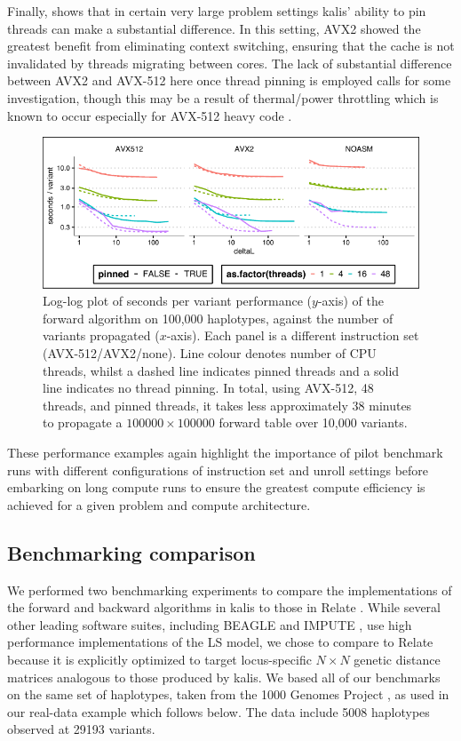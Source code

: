 \documentclass[pdflatex,referee,lineno,sn-nature]{sn-jnl}%
\newcommand{\pkg}[1]{{\fontseries{m}\fontseries{b}\selectfont #1}}
\begin{document}
Finally,  shows that in certain very large problem settings \pkg{kalis}' ability to pin threads can make a substantial difference.
In this setting, AVX2 showed the greatest benefit from eliminating context switching, ensuring that the cache is not invalidated by threads migrating between cores.
The lack of substantial difference between AVX2 and AVX-512 here once thread pinning is employed calls for some investigation, though this may be a result of thermal/power throttling which is known to occur especially for AVX-512 heavy code \citep{schone2019energy}.

\begin{figure}
  \centering
  \includegraphics{fig4}
	\caption{
	  Log-log plot of seconds per variant performance ($y$-axis) of the forward algorithm on 100,000 haplotypes, against the number of variants propagated ($x$-axis).
	  Each panel is a different instruction set (AVX-512/AVX2/none).
	  Line colour denotes number of CPU threads, whilst a dashed line indicates pinned threads and a solid line indicates no thread pinning.
	  In total, using AVX-512, 48 threads, and pinned threads, it takes less approximately 38 minutes to propagate a $100000 \times 100000$ forward table over 10,000 variants.
	}
	\label{fig:perfdeltaL2}
\end{figure}

These performance examples again highlight the importance of pilot benchmark runs with different configurations of instruction set and unroll settings before embarking on long compute runs to ensure the greatest compute efficiency is achieved for a given problem and compute architecture.

\subsection*{Benchmarking comparison}

We performed two benchmarking experiments to compare the implementations of the forward and backward algorithms in \pkg{kalis} to those in Relate \cite{speidel}.
While several other leading software suites, including BEAGLE \cite{beagle} and IMPUTE \cite{impute}, use high performance implementations of the LS model, we chose to compare to Relate because it is explicitly optimized to target locus-specific $N \times N$ genetic distance matrices analogous to those produced by \pkg{kalis}.
We based all of our benchmarks on the same set of haplotypes, taken from the 1000 Genomes Project \cite{10002015global}, as used in our real-data example which follows below.
The data include 5008 haplotypes observed at 29193 variants.
\end{document}
